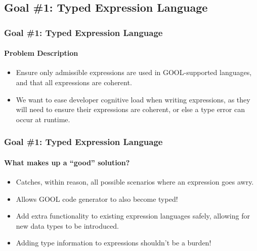 \documentclass{beamer}
\begin{document}
\subsection{Goal \#1: Typed Expression Language}

\begin{frame}
    \frametitle{Goal \#1: Typed Expression Language}
    \framesubtitle{Problem Description}
    
    \begin{itemize}
        \item<2-> Ensure only admissible expressions are used in GOOL-supported languages, and that all expressions are coherent.
        \item<3-> We want to ease developer cognitive load when writing expressions, as they will need to ensure their expressions are coherent, or else a type error can occur at runtime.
    \end{itemize}
\end{frame}

\begin{frame}
    \frametitle{Goal \#1: Typed Expression Language}
    \framesubtitle{What makes up a ``good'' solution?}
    
    \begin{itemize}
        \item<2-> Catches, within reason, all possible scenarios where an expression goes awry.
        \item<3-> Allows GOOL code generator to also become typed!
        \item<4-> Add extra functionality to existing expression languages safely, allowing for new data types to be introduced.
        \item<5-> Adding type information to expressions shouldn't be a burden!
    \end{itemize}
\end{frame}
\end{document}
